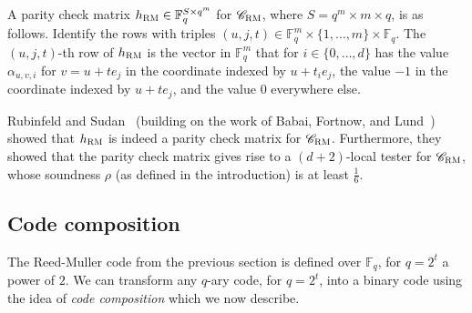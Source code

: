 \documentclass[11pt]{article}
\newtheorem{theorem}{Theorem}[section]
\theoremstyle{definition}
\newcommand{\code}{\mathscr{C}}
\newcommand{\F}{\ensuremath{\mathbb{F}}}
\newcommand{\mX}{\ensuremath{\mathcal{X}}}
\newcommand{\RM}{\ensuremath{\textsc{RM}}}
\DeclareMathOperator{\poly}{poly}
\newcommand{\eps}{\varepsilon}
\DeclareMathOperator{\tr}{tr}
\begin{document}
A parity check matrix $h_{\RM} \in \F_q^{S \times q^m}$ for $\code_{\RM}$, where $S = q^m \times m \times q$, is as follows. Identify the rows with triples $(u,j,t) \in \F_q^m \times \{1,\ldots,m\} \times \F_q$. The $(u,j,t)$-th row of $h_{\RM}$ is the vector in $\F_q^m$ that for $i \in \{0,\ldots,d\}$ has the value $\alpha_{u,v,i}$ for $v = u + t e_j$ in the coordinate indexed by $u + t_i e_j$, the value $-1$ in the coordinate indexed by $u + te_j$, and the value $0$ everywhere else. 

Rubinfeld and Sudan~\cite{rubinfeld1996robust} (building on the work of Babai, Fortnow, and Lund~\cite{babai1991non}) showed that $h_{\RM}$ is indeed a parity check matrix for $\code_{\RM}$. Furthermore, they showed that the parity check matrix gives rise to a $(d+2)$-local tester for $\code_{\RM}$, whose soundness $\rho$ (as defined in the introduction) is at least $\frac{1}{6}$. 




\subsection{Code composition}
\label{sec:code-comp}

 The Reed-Muller code from the previous section is defined over $\F_q$, for $q=2^t$ a power of $2$. We can transform any $q$-ary code, for $q=2^t$, into a binary code using the idea of \emph{code composition} which we now describe. 


\end{document}
